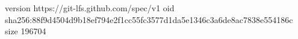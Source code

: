 version https://git-lfs.github.com/spec/v1
oid sha256:88f9d4504d9b18ef794e2f1cc55fc3577d1da5e1346c3a6de8ac7838e554186c
size 196704
